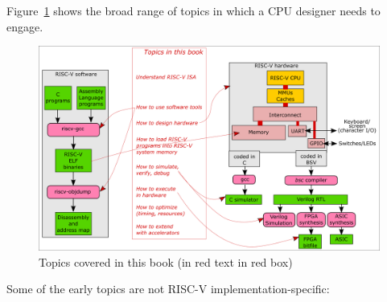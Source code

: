 Figure~\ref{fig_Topics} shows the broad range of topics in which a CPU
designer needs to engage.
\begin{figure}[htbp]
  \centerline{\includegraphics[width=6in,angle=0]{Figures/fig_Topics}}
  \caption{\label{fig_Topics}Topics covered in this book (in red text in red box)}
\end{figure}
Some of the early topics are not RISC-V implementation-specific:

